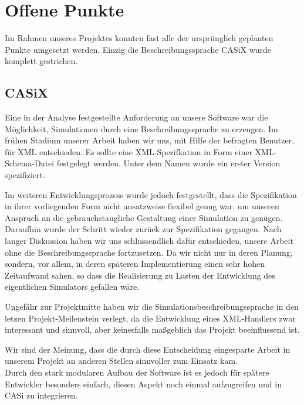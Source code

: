 
\section{Offene Punkte}\label{sec:conc_open_questions}
Im Rahmen unseres Projektes konnten fast alle der ursprünglich geplanten Punkte umgesetzt werden. Einzig die Beschreibungssprache CASiX wurde komplett gestrichen.

\subsection{CASiX}\label{subsec:conc_open_questions_casix}
Eine in der Analyse festgestellte Anforderung an unsere Software war die Möglichkeit, Simulationen durch eine Beschreibungssprache zu erzeugen. Im frühen Stadium unserer Arbeit haben wir uns, mit Hilfe der befragten Benutzer, für XML entschieden. Es sollte eine XML-Spezifkation in Form einer XML-Schema-Datei festgelegt werden. Unter dem Namen  wurde ein erster Version spezifiziert.

Im weiteren Entwicklungsprozess wurde jedoch festgestellt, dass die Spezifikation in ihrer vorliegenden Form nicht ansatzweise flexibel genug war, um unseren Anspruch an die gebrauchstaugliche Gestaltung einer Simulation zu genügen. Daraufhin wurde der Schritt wieder zurück zur Spezifikation gegangen. Nach langer Diskussion haben wir uns schlussendlich dafür entschieden, unsere Arbeit ohne die Beschreibungssprache fortzusetzen. Da wir nicht nur in deren Planung, sondern, vor allem, in deren späteren Implementierung einen sehr hohen Zeitaufwand sahen, so dass die Realisierung zu Lasten der Entwicklung des eigentlichen Simulators gefallen wäre.

Ungefähr zur Projektmitte haben wir die Simulations\-beschreibungs\-sprache in den letzen Projekt-Meilenstein verlegt, da die Entwicklung eines XML-Handlers zwar interessant und sinnvoll, aber keinesfalls maßgeblich das Projekt beeinflussend ist. 

Wir sind der Meinung, dass die durch diese Entscheidung eingesparte Arbeit in unserem Projekt an anderen Stellen sinnvoller zum Einsatz kam.\\

Durch den stark modularen Aufbau der Software ist es jedoch für spätere Entwickler besonders einfach, diesen Aspekt noch einmal aufzugreifen und in CASi zu integrieren.

